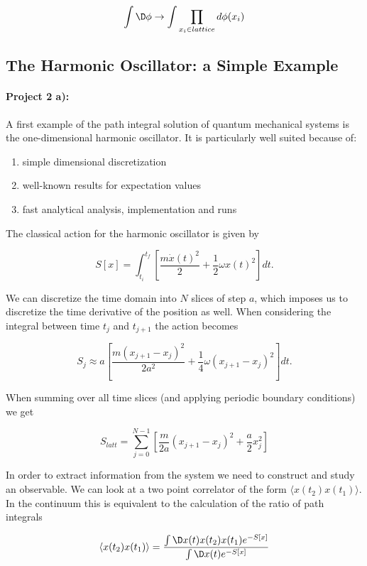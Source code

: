 \documentclass[%
oneside,                 %
final,                   %
10pt]{article}
\begin{document}
\[
	 \int \D \phi \rightarrow \int \prod_{x_i \in lattice} d\phi(x_i)
\] 

\subsection{The Harmonic Oscillator: a Simple Example}

\paragraph{Project 2 a):}
A first example of the path integral solution of quantum mechanical
systems is the one-dimensional harmonic oscillator. It is particularly
well suited because of:

\begin{enumerate}
\item simple dimensional discretization

\item well-known results for expectation values

\item fast analytical analysis, implementation and runs 
\end{enumerate}

\noindent
The classical action for the harmonic oscillator is given by

\[
	S[x] = \int_{t_i}^{t_f} \left[ \frac{m\dot{x}(t)^2}{2} + \frac{1}{2}\omega x(t)^2\right] dt.
\]

We can discretize the time domain into $N$ slices of step $a$, which
imposes us to discretize the time derivative of the position as
well. When considering the integral between time $t_j$ and $t_{j+1}$
the action becomes

\[
	S_{j} \approx a\left[ \frac{m(x_{j+1}-x_j)^2}{2a^2} + \frac{1}{4}\omega (x_{j+1} - x_j)^2 \right] dt.
\]

When summing over all time slices (and applying periodic boundary conditions) we get

\[	
	S_{latt} = \sum_{j = 0}^{N-1} \left[ \frac{m}{2a}(x_{j+1}-x_j)^2 + \frac{a}{2} x_j^2 \right]
\]

In order to extract information from the system we need to construct
and study an observable. We can look at a two point correlator of the
form $\langle x(t_2)x(t_1) \rangle$.  In the continuum this is
equivalent to the calculation of the ratio of path integrals

\[
	\langle x(t_2)x(t_1) \rangle = \frac{\int \D x(t) x(t_2) x(t_1) e^{-S[x]}}{\int \D x(t) e^{-S[x]}}
\]
\end{document}
